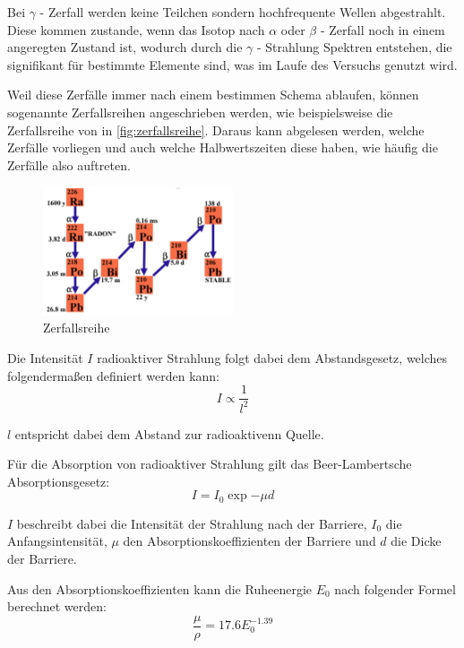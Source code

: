 \documentclass[12pt,english,ngerman]{scrartcl}
\begin{document}
Bei $\gamma$ - Zerfall werden keine Teilchen sondern hochfrequente Wellen abgestrahlt. Diese kommen zustande,
wenn das Isotop nach $\alpha$ oder $\beta$ - Zerfall noch in einem angeregten Zustand ist, wodurch durch die
$\gamma$ - Strahlung Spektren entstehen, die signifikant für bestimmte Elemente sind, was im Laufe des Versuchs 
genutzt wird.


Weil diese Zerfälle immer nach einem bestimmen Schema ablaufen, können sogenannte Zerfallsreihen angeschrieben werden, 
wie beispielsweise die Zerfallsreihe von  in \autoref{fig:zerfallsreihe}. Daraus kann abgelesen
werden, welche Zerfälle vorliegen und auch welche Halbwertszeiten diese haben, wie häufig die Zerfälle also auftreten.

\begin{figure}[H]
  \begin{center}
  \includegraphics[width=0.5\textwidth]{./figures/zerfallsreihe.png}
	\end{center}
	\caption{Zerfallsreihe  \cite[]{}}
	\label{fig:zerfallsreihe}
    
\end{figure}


Die Intensität $I$ radioaktiver Strahlung folgt dabei dem Abstandsgesetz, welches folgendermaßen definiert werden kann:
\begin{equation}
  I \propto \frac{1}{l^2}
\end{equation}

$l$ entspricht dabei dem Abstand zur radioaktivenn Quelle.

Für die Absorption von radioaktiver Strahlung gilt das Beer-Lambertsche Absorptionsgesetz:
\begin{equation}
  I = I_0 \exp{-\mu d}
\end{equation}

$I$ beschreibt dabei die Intensität der Strahlung nach der Barriere, $I_0$ die Anfangsintensität, 
$\mu$ den Absorptionskoeffizienten der Barriere und $d$ die Dicke der Barriere.

Aus den Absorptionskoeffizienten kann die Ruheenergie $E_0$ nach folgender Formel berechnet werden:
\begin{equation}
  \frac{\mu}{\rho} = 17.6 E_0^{-1.39}
\end{equation}
\end{document}
